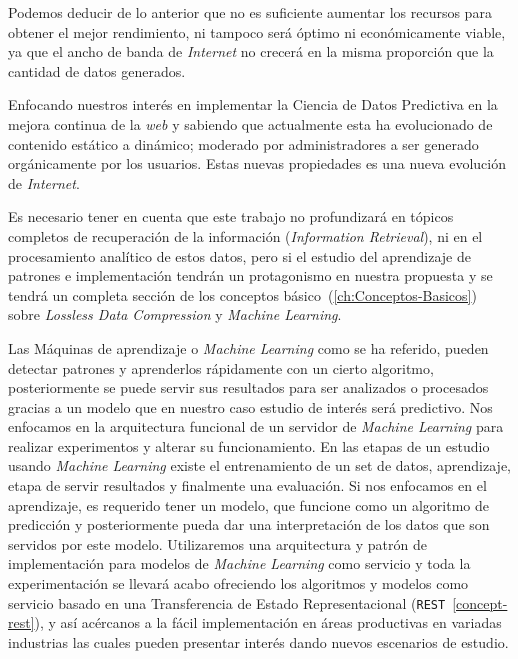 Podemos deducir de lo anterior que no es suficiente aumentar los recursos para obtener el mejor rendimiento, ni tampoco será óptimo ni económicamente viable, ya que el ancho de banda de \emph{Internet} no crecerá en la misma proporción que la cantidad de datos generados.

	Enfocando nuestros interés en implementar  la Ciencia de Datos Predictiva en la mejora continua de la \emph{web} y sabiendo que  actualmente esta ha evolucionado de  contenido estático a dinámico; moderado por administradores a ser  generado orgánicamente por los usuarios. Estas nuevas propiedades es una nueva evolución de \emph{Internet}. 
	
	Es necesario tener en cuenta que este trabajo no profundizará en tópicos completos de recuperación de la información (\emph{Information Retrieval}), ni en el procesamiento analítico de estos datos, pero si el estudio del aprendizaje de patrones e implementación tendrán un protagonismo en nuestra propuesta y se tendrá un completa sección de los conceptos básico~(\ref{ch:Conceptos-Basicos}) sobre \emph{Lossless Data Compression} y \emph{Machine Learning}.

	Las Máquinas de aprendizaje o \emph{Machine Learning} como se ha referido, pueden detectar patrones y aprenderlos rápidamente con un cierto algoritmo, posteriormente se puede servir sus resultados para ser analizados o procesados gracias a un modelo que en nuestro caso estudio de interés será predictivo. Nos enfocamos en la arquitectura funcional de un servidor de \emph{Machine Learning} para realizar experimentos y alterar su funcionamiento. En las etapas de un estudio usando \emph{Machine Learning} existe el entrenamiento de un set de datos, aprendizaje, etapa de servir resultados y finalmente una evaluación.  Si nos enfocamos en el aprendizaje, es requerido tener un modelo, que funcione como un algoritmo de predicción y posteriormente pueda dar una interpretación de los datos que son servidos por este modelo. Utilizaremos una arquitectura y patrón de implementación para modelos de \emph{Machine Learning} como servicio y toda la experimentación se llevará acabo ofreciendo los algoritmos y modelos como servicio basado en una Transferencia de Estado Representacional (\texttt{REST}~\ref{concept-rest}), y así acércanos a la fácil implementación en áreas productivas en variadas industrias las cuales pueden presentar interés dando nuevos escenarios de estudio.

	

